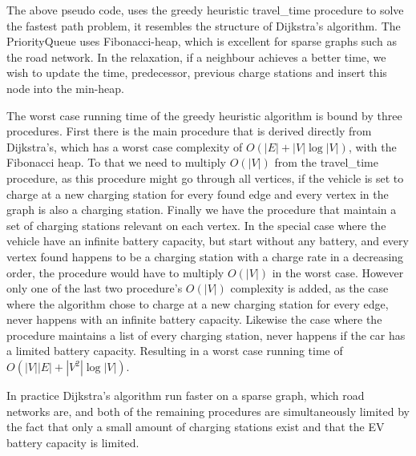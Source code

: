 The above pseudo code, uses the greedy heuristic travel\_time procedure to solve the fastest path problem, it resembles the structure of Dijkstra's algorithm. The PriorityQueue uses Fibonacci-heap, which is excellent for sparse graphs such as the road network. In the relaxation, if a neighbour achieves a better time, we wish to update the time, predecessor, previous charge stations and insert this node into the min-heap.

The worst case running time of the greedy heuristic algorithm is bound by three procedures. First there is the main procedure that is derived directly from Dijkstra's, which has a worst case complexity of $O(|E|+|V|\log|V|)$, with the Fibonacci heap. To that we need to multiply $O(|V|)$ from the travel\_time procedure, as this procedure might go through all vertices, if the vehicle is set to charge at a new charging station for every found edge and every vertex in the graph is also a charging station. Finally we have the procedure that maintain a set of charging stations relevant on each vertex. In the special case where the vehicle have an infinite battery capacity, but start without any battery, and every vertex found happens to be a charging station with a charge rate in a decreasing order, the procedure would have to multiply $O(|V|)$ in the worst case.
However only one of the last two procedure's $O(|V|)$ complexity is added, as the case where the algorithm chose to charge at a new charging station for every edge, never happens with an infinite battery capacity. Likewise the case where the procedure maintains a list of every charging station, never happens if the car has a limited battery capacity. Resulting in a worst case running time of $O(|V||E|+|V^2|\log|V|)$. %

In practice Dijkstra's algorithm run faster on a sparse graph, which road networks are, and both of the remaining procedures are simultaneously limited by the fact that only a small amount of charging stations exist and that the EV battery capacity is limited.